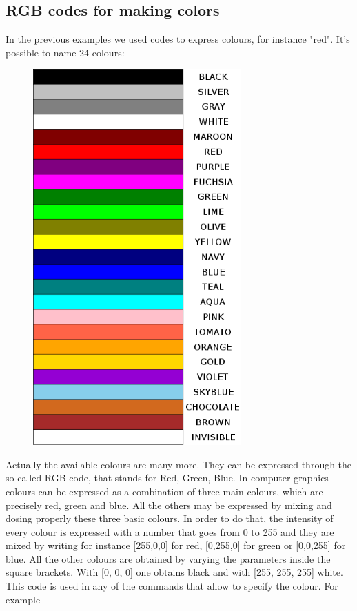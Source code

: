 \subsection{RGB codes for making colors}

In the previous examples we used codes to express colours, for instance "red". It's possible to name 24 colours:

\vskip 1cm

\begin{figure}[H]
   \centering
   \includegraphics[width=8.0cm,trim=4 4 8 4,clip]{./images/disegnare/disegnare-16.png}
   \label{dis-16-a}
\end{figure}

Actually the available colours are many more. They can be expressed through the so called RGB code, that stands for Red, Green, Blue.
In computer graphics colours can be expressed as a combination of three main colours, which are precisely red, green and blue.
All the others may be expressed by mixing and dosing properly these three basic colours. In order to do that, the intensity of every colour is expressed with a number that goes from 0 to 255 and they are mixed by writing for instance [255,0,0] for red, [0,255,0] for green or [0,0,255] for blue. All the other colours are obtained by varying the parameters inside the square brackets. With [0, 0, 0]  one obtains black and with [255, 255, 255] white. This code is used in any of the commands that allow to specify the colour. For example

